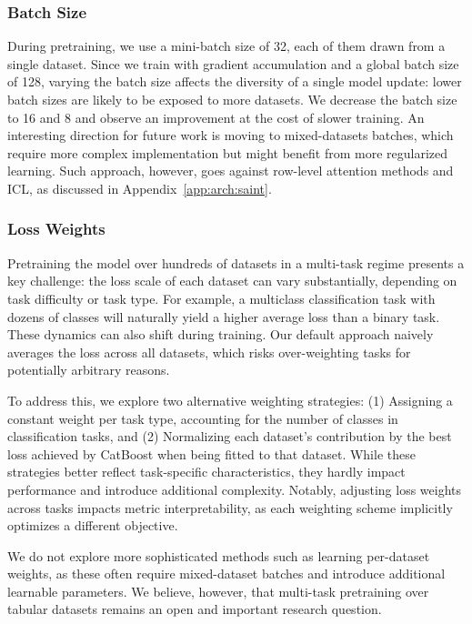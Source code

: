 \subsubsection{Batch Size}\label{app:exp_batch_size}

During pretraining, we use a mini-batch size of 32, each of them drawn from a single dataset. Since we train with gradient accumulation and a global batch size of 128, varying the batch size affects the diversity of a single model update: lower batch sizes are likely to be exposed to more datasets. We decrease the batch size to 16 and 8 and observe an improvement at the cost of slower training. An interesting direction for future work is moving to mixed-datasets batches, which require more complex implementation but might benefit from more regularized learning. Such approach, however, goes against row-level attention methods and ICL, as discussed in Appendix~\ref{app:arch:saint}.

\subsubsection{Loss Weights}\label{app:exp_weights}

Pretraining the model over hundreds of datasets in a multi-task regime presents a key challenge: the loss scale of each dataset can vary substantially, depending on task difficulty or task type. For example, a multiclass classification task with dozens of classes will naturally yield a higher average loss than a binary task. These dynamics can also shift during training. Our default approach naively averages the loss across all datasets, which risks over-weighting tasks for potentially arbitrary reasons.

To address this, we explore two alternative weighting strategies: (1) Assigning a constant weight per task type, accounting for the number of classes in classification tasks, and (2) Normalizing each dataset's contribution by the best loss achieved by CatBoost \cite{prokhorenkova_catboost_2018} when being fitted to that dataset. While these strategies better reflect task-specific characteristics, they hardly impact performance and introduce additional complexity. Notably, adjusting loss weights across tasks impacts metric interpretability, as each weighting scheme implicitly optimizes a different objective. 

We do not explore more sophisticated methods such as learning per-dataset weights, as these often require mixed-dataset batches and introduce additional learnable parameters. We believe, however, that multi-task pretraining over tabular datasets remains an open and important research question.


